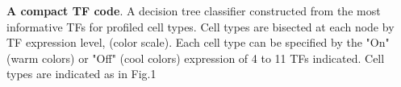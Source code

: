 \textbf{A compact TF code}. A decision tree classifier constructed from the most informative TFs for profiled cell types. Cell types are bisected at each node by TF expression level, (color scale). Each cell type can be specified by the "On" (warm colors) or "Off" (cool colors) expression of 4 to 11 TFs indicated. Cell types are indicated as in Fig.1
